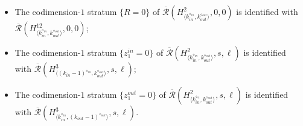 \documentclass{article}
\def\Rbar{\overline{\mathcal{R}}}
\begin{document}
\begin{itemize}
    \item The codimension-$1$ stratum $\{R=0\}$ of $\Rbar(H^2_{\langle k_{in}^{\diamond_{in}},k_{out}^{\diamond_{out}}\rangle},0,0)$ is identified with $\Rbar(H^{12}_{\langle k_{in}^{\diamond_{in}},k_{out}^{\diamond_{out}}\rangle},0,0)$;
    \item The codimension-$1$ stratum $\{z^{in}_1 = 0\}$ of $\Rbar(H^2_{\langle k_{in}^{\diamond_{in}},k_{out}^{\diamond_{out}}\rangle},s,\ell)$ is identified with $\Rbar(H^3_{\langle (k_{in}-1)^{\diamond_{in}},k_{out}^{\diamond_{out}}\rangle},s,\ell)$;    
    \item The codimension-$1$ stratum $\{z^{out}_1 = 0\}$ of $\Rbar(H^2_{\langle k^{\diamond_{\in}}_{in},k^{\diamond_{out}}_{out}\rangle},s,\ell)$ is identified with $\Rbar(H^3_{\langle k^{\diamond_{in}}_{in},(k_{out}-1)^{\diamond_{out}}\rangle},s,\ell)$.
\end{itemize}
\end{document}
